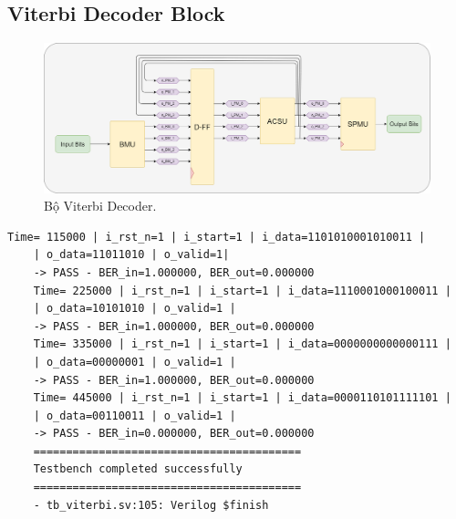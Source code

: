 \subsection{Viterbi Decoder Block}

\begin{figure}[H]
	\centering
	\includegraphics[width=.7\linewidth]{sections/pic/mophongbangSystemVerilog/viterbi_decoder.png}
	\caption{Bộ Viterbi Decoder.}
\end{figure}

\begin{lstlisting}[style=StyleResult]
	Time= 115000 | i_rst_n=1 | i_start=1 | i_data=1101010001010011 |
	| o_data=11011010 | o_valid=1| 
	-> PASS - BER_in=1.000000, BER_out=0.000000
	Time= 225000 | i_rst_n=1 | i_start=1 | i_data=1110001000100011 |
	| o_data=10101010 | o_valid=1 |
	-> PASS - BER_in=1.000000, BER_out=0.000000
	Time= 335000 | i_rst_n=1 | i_start=1 | i_data=0000000000000111 | 
	| o_data=00000001 | o_valid=1 | 
	-> PASS - BER_in=1.000000, BER_out=0.000000
	Time= 445000 | i_rst_n=1 | i_start=1 | i_data=0000110101111101 |
	| o_data=00110011 | o_valid=1 |
	-> PASS - BER_in=0.000000, BER_out=0.000000
	=========================================
	Testbench completed successfully
	=========================================
	- tb_viterbi.sv:105: Verilog $finish
	
\end{lstlisting}
